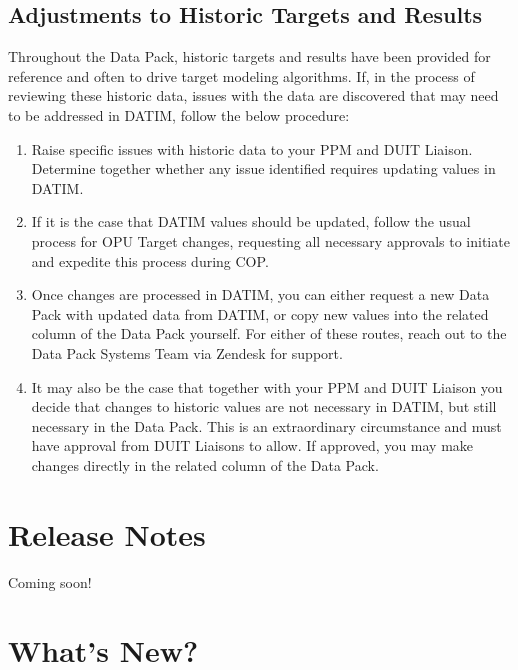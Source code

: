 \documentclass[
  openany]{book}
\begin{document}
\hypertarget{adjustments-to-historic-targets-and-results}{%
\section{Adjustments to Historic Targets and Results}\label{adjustments-to-historic-targets-and-results}}

Throughout the Data Pack, historic targets and results have been
provided for reference and often to drive target modeling algorithms.
If, in the process of reviewing these historic data, issues with the
data are discovered that may need to be addressed in DATIM, follow the
below procedure:

\begin{enumerate}
\def\labelenumi{\arabic{enumi}.}
\item
  Raise specific issues with historic data to your PPM and DUIT
  Liaison. Determine together whether any issue identified requires
  updating values in DATIM.
\item
  If it is the case that DATIM values should be updated, follow the
  usual process for OPU Target changes, requesting all necessary
  approvals to initiate and expedite this process during COP.
\item
  Once changes are processed in DATIM, you can either request a new
  Data Pack with updated data from DATIM, or copy new values into the
  related column of the Data Pack yourself. For either of these
  routes, reach out to the Data Pack Systems Team via Zendesk for
  support.
\item
  It may also be the case that together with your PPM and DUIT Liaison
  you decide that changes to historic values are not necessary in
  DATIM, but still necessary in the Data Pack. This is an
  extraordinary circumstance and must have approval from DUIT Liaisons
  to allow. If approved, you may make changes directly in the related
  column of the Data Pack.
\end{enumerate}

\newpage

\hypertarget{release-notes}{%
\chapter{Release Notes}\label{release-notes}}

Coming soon!

\hypertarget{whats-new}{%
\chapter{What's New?}\label{whats-new}}
\end{document}
